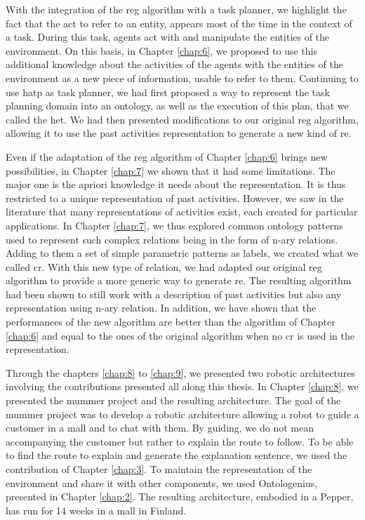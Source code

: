 With the integration of the \acrshort{reg} algorithm with a task planner, we highlight the fact that the act to refer to an entity, appears most of the time in the context of a task. During this task, agents act with and manipulate the entities of the environment. On this basis, in Chapter \ref{chap:6}, we proposed to use this additional knowledge about the activities of the agents with the entities of the environment as a new piece of information, usable to refer to them. Continuing to use \acrshort{hatp} as task planner, we had first proposed a way to represent the task planning domain into an ontology, as well as the execution of this plan, that we called the \acrfull{het}. We had then presented modifications to our original \acrshort{reg} algorithm, allowing it to use the past activities representation to generate a new kind of \acrfull{re}.

Even if the adaptation of the \acrshort{reg} algorithm of Chapter \ref{chap:6} brings new possibilities, in Chapter \ref{chap:7} we shown that it had some limitations. The major one is the apriori knowledge it needs about the representation. It is thus restricted to a unique representation of past activities. However, we saw in the literature that many representations of activities exist, each created for particular applications. In Chapter \ref{chap:7}, we thus explored common ontology patterns used to represent such complex relations being in the form of n-ary relations. Adding to them a set of simple parametric patterns as labels, we created what we called \acrfull{cr}. With this new type of relation, we had adapted our original \acrshort{reg} algorithm to provide a more generic way to generate \acrshort{re}. The resulting algorithm had been shown to still work with a description of past activities but also any representation using n-ary relation. In addition, we have shown that the performances of the new algorithm are better than the algorithm of Chapter \ref{chap:6} and equal to the ones of the original algorithm when no \acrshort{cr} is used in the representation.

Through the chapters \ref{chap:8} to \ref{chap:9}, we presented two robotic architectures involving the contributions presented all along this thesis. In Chapter \ref{chap:8}, we presented the \acrfull{mummer} project and the resulting architecture. The goal of the \acrshort{mummer} project was to develop a robotic architecture allowing a robot to guide a customer in a mall and to chat with them. By guiding, we do not mean accompanying the customer but rather to explain the route to follow. To be able to find the route to explain and generate the explanation sentence, we used the contribution of Chapter \ref{chap:3}. To maintain the representation of the environment and share it with other components, we used Ontologenius, presented in Chapter \ref{chap:2}. The resulting architecture, embodied in a Pepper, has run for 14 weeks in a mall in Finland.

